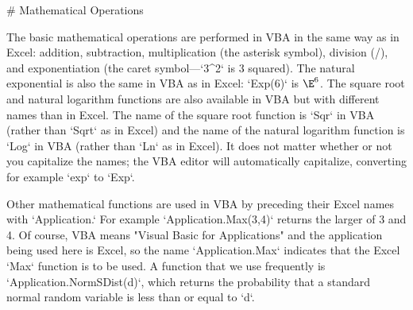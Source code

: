 # Mathematical Operations


The basic mathematical operations are performed in VBA in the same way
as in Excel: addition, subtraction, multiplication (the asterisk
symbol), division (/), and exponentiation (the caret symbol---`3^2` is 3
squared). The natural exponential is also the same in VBA as in Excel:
`Exp(6)` is $\E^6$. The square root and natural logarithm functions are
also available in VBA but with different names than in Excel. The name
of the square root function is `Sqr` in VBA (rather than `Sqrt` as in
Excel) and the name of the natural logarithm function is `Log` in VBA
(rather than `Ln` as in Excel). It does not matter whether or not you
capitalize the names; the VBA editor will automatically capitalize,
converting for example `exp` to `Exp`.

Other mathematical functions are used in VBA by preceding their Excel
names with `Application.` For example `Application.Max(3,4)` returns the
larger of 3 and 4. Of course, VBA means "Visual Basic for Applications"
and the application being used here is Excel, so the name
`Application.Max` indicates that the Excel `Max` function is to be used.
A function that we use frequently is `Application.NormSDist(d)`, which
returns the probability that a standard normal random variable is less
than or equal to `d`.

